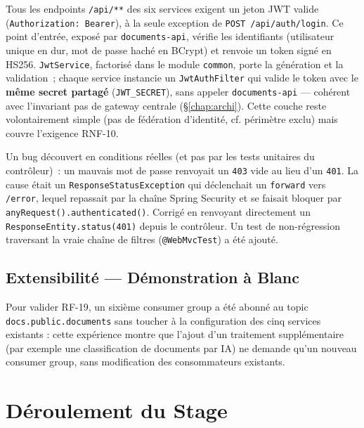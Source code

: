 \documentclass[12pt,a4paper,openany]{report}
\begin{document}
    Tous les endpoints \texttt{/api/**} des six services exigent un jeton JWT valide (\texttt{Authorization: Bearer}), \`a la seule exception de \texttt{POST /api/auth/login}. Ce point d'entr\'ee, expos\'e par \texttt{documents-api}, v\'erifie les identifiants (utilisateur unique en dur, mot de passe hach\'e en BCrypt) et renvoie un token sign\'e en HS256. \texttt{JwtService}, factoris\'e dans le module \texttt{common}, porte la g\'en\'eration et la validation~; chaque service instancie un \texttt{JwtAuthFilter} qui valide le token avec le \textbf{m\^eme secret partag\'e} (\texttt{JWT\_SECRET}), sans appeler \texttt{documents-api} --- coh\'erent avec l'invariant \og pas de gateway centrale \fg{} (\S\ref{chap:archi}). Cette couche reste volontairement simple (pas de f\'ed\'eration d'identit\'e, cf. p\'erim\`etre exclu) mais couvre l'exigence RNF-10.

    \begin{notebox}
    Un bug d\'ecouvert en conditions r\'eelles (et pas par les tests unitaires du contr\^oleur)~: un mauvais mot de passe renvoyait un \texttt{403} vide au lieu d'un \texttt{401}. La cause \'etait un \texttt{ResponseStatusException} qui d\'eclenchait un \texttt{forward} vers \texttt{/error}, lequel repassait par la cha\^ine Spring Security et se faisait bloquer par \texttt{anyRequest().authenticated()}. Corrig\'e en renvoyant directement un \texttt{ResponseEntity.status(401)} depuis le contr\^oleur. Un test de non-r\'egression traversant la vraie cha\^ine de filtres (\texttt{@WebMvcTest}) a \'et\'e ajout\'e.
    \end{notebox}

    \section{Extensibilit\'e --- D\'emonstration \`a Blanc}
    \label{sec:extensibilite}

    Pour valider RF-19, un sixi\`eme consumer group a \'et\'e abonn\'e au topic \texttt{docs.public.documents} sans toucher \`a la configuration des cinq services existants : cette exp\'erience montre que l'ajout d'un traitement suppl\'ementaire (par exemple une classification de documents par IA) ne demande qu'un nouveau consumer group, sans modification des consommateurs existants.

    \chapter{D\'eroulement du Stage}
    \label{chap:planning-rapport}
\end{document}

